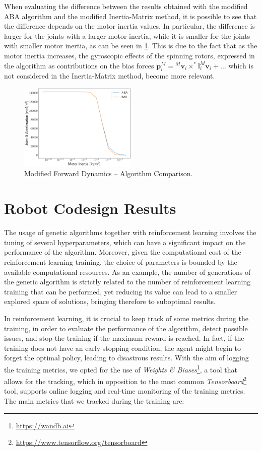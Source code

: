When evaluating the difference between the results obtained with the modified \ac{ABA} algorithm and the modified Inertia-Matrix method, it is possible to see that the difference depends on the motor inertia values. In particular, the difference is larger for the joints with a larger motor inertia, while it is smaller for the joints with smaller motor inertia, as can be seen in \cref{fig:fd_comparison}. This is due to the fact that as the motor inertia increases, the gyroscopic effects of the spinning rotors,
expressed in the algorithm as contributions on the bias forces $\mathbf{p}^M _i = {}^M \mathbf{v}_i \times ^* \mathbb{I} _i ^M \mathbf{v}_i + \dots$ which is not considered in the Inertia-Matrix method, become more relevant.

\begin{figure}
    \centering
    \caption{Modified Forward Dynamics -- Algorithm Comparison.}
    \label{fig:fd_comparison}
    \includegraphics[width=0.5\textwidth]{Images/Results/ABA_IMB.png}
\end{figure}

\section{Robot Codesign Results}

The usage of genetic algorithms together with reinforcement learning involves the tuning of several hyperparameters, which can have a significant impact on the performance of the algorithm. Moreover, given the computational cost of the reinforcement learning training, the choice of parameters is bounded by the available computational resources. As an example, the number of generations of the genetic algorithm is strictly related to the number of reinforcement learning training that can be performed, yet reducing its value can lead to a smaller explored space of solutions, bringing therefore to suboptimal results.

In reinforcement learning, it is crucial to keep track of some metrics during the training, in order to evaluate the performance of the algorithm, detect possible issues, and stop the training if the maximum reward is reached. In fact, if the training does not have an early stopping condition, the agent might begin to forget the optimal policy, leading to disastrous results. With the aim of logging the training metrics, we opted for the use of \textit{Weights {\&} Biases}\footnote{\url{https://wandb.ai}}, a tool that allows for the tracking, which in opposition to the most common \textit{Tensorboard}\footnote{\url{https://www.tensorflow.org/tensorboard}} tool, supports online logging and real-time monitoring of the training metrics. The main metrics that we tracked during the training are:

